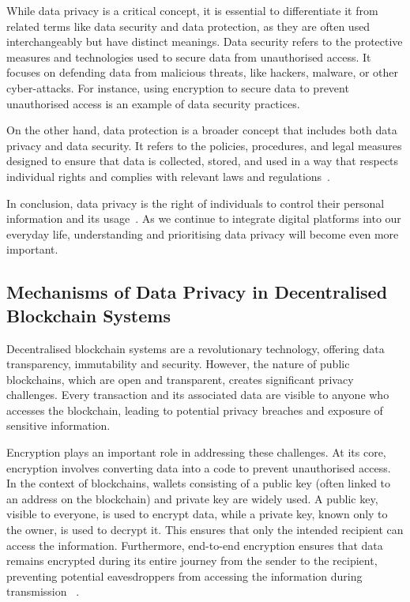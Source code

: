While data privacy is a critical concept, it is essential to differentiate it from related terms like data security and data protection, as they are often used interchangeably but have distinct meanings.
Data security refers to the protective measures and technologies used to secure data from unauthorised access. It focuses on defending data from malicious threats, like hackers, malware, or other cyber-attacks. For instance, using encryption to secure data to prevent unauthorised access is an example of data security practices.

On the other hand, data protection is a broader concept that includes both data privacy and data security. It refers to the policies, procedures, and legal measures designed to ensure that data is collected, stored, and used in a way that respects individual rights and complies with relevant laws and regulations~\cite{Covert.2020}. 

In conclusion, data privacy is the right of individuals to control their personal information and its usage~\cite{Covert.2020}. As we continue to integrate digital platforms into our everyday life, understanding and prioritising data privacy will become even more important.

\subsection{Mechanisms of Data Privacy in Decentralised Blockchain Systems}
Decentralised blockchain systems are a revolutionary technology, offering data transparency, immutability and security. However, the nature of public blockchains, which are open and transparent, creates significant privacy challenges. Every transaction and its associated data are visible to anyone who accesses the blockchain, leading to potential privacy breaches and exposure of sensitive information.

Encryption plays an important role in addressing these challenges. At its core, encryption involves converting data into a code to prevent unauthorised access. In the context of blockchains, wallets consisting of a public key (often linked to an address on the blockchain) and private key are widely used. A public key, visible to everyone, is used to encrypt data, while a private key, known only to the owner, is used to decrypt it. This ensures that only the intended recipient can access the information. Furthermore, end-to-end encryption ensures that data remains encrypted during its entire journey from the sender to the recipient, preventing potential eavesdroppers from accessing the information during transmission ~\cite{Tran.2022b}.

